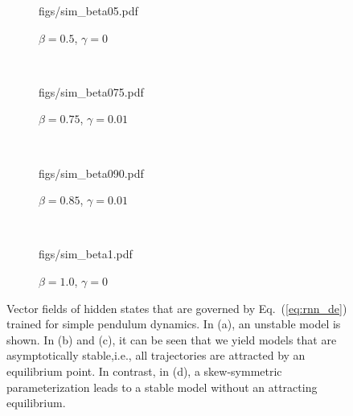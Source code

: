 \documentclass{article} \usepackage{iclr2021_conference,times}
\begin{document}
\begin{figure}[!t]
	\centering
	\begin{subfigure}[t]{0.23\textwidth}
		\centering
		\begin{overpic}[width=1\textwidth]{figs/sim_beta05.pdf}
\end{overpic}\vspace{-0.1cm}		
		\caption{$\beta=0.5$, $\gamma=0$}
	\end{subfigure}~
	\begin{subfigure}[t]{0.23\textwidth}
		\centering
		\begin{overpic}[width=1\textwidth]{figs/sim_beta075.pdf} 
\end{overpic}\vspace{-0.1cm}			
		\caption{$\beta=0.75$, $\gamma=0.01$}
	\end{subfigure}~
	\begin{subfigure}[t]{0.23\textwidth}
		\centering
		\begin{overpic}[width=1\textwidth]{figs/sim_beta090.pdf} 
\end{overpic}\vspace{-0.1cm}			
		\caption{$\beta=0.85$, $\gamma=0.01$}
	\end{subfigure}~
	\begin{subfigure}[t]{0.23\textwidth}
		\centering
		\begin{overpic}[width=1\textwidth]{figs/sim_beta1.pdf} 
\end{overpic}\vspace{-0.1cm}			
		\caption{$\beta=1.0$, $\gamma=0$}
	\end{subfigure}

	\caption{Vector fields of hidden states that are governed by Eq.~(\ref{eq:rnn_de}) trained for simple pendulum dynamics. In (a), an unstable model is shown. In (b) and (c), it can be seen that we yield models that are asymptotically stable,i.e., all trajectories are attracted by an equilibrium point. In contrast, in (d), a skew-symmetric parameterization leads to a stable model without an attracting equilibrium.}	
	
	\label{fig:stability_simulation}
\end{figure}
\end{document}
